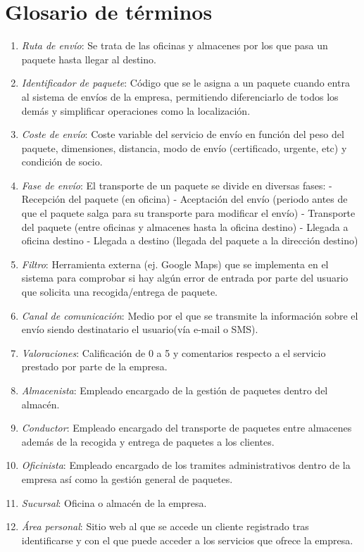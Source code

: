 \section{Glosario de términos}
	\begin{enumerate}
		\item \textit{Ruta de envío}: Se trata de las oficinas y almacenes por los que pasa un paquete hasta llegar al destino.
		\item \textit{Identificador de paquete}: Código que se le asigna a un paquete cuando entra al sistema de envíos de la empresa, permitiendo diferenciarlo de todos los demás y simplificar operaciones como la localización.
		\item \textit{Coste de envío}: Coste variable del servicio de envío en función del peso del paquete, dimensiones, distancia, modo de envío (certificado, urgente, etc) y condición de socio.
		\item \textit{Fase de envío}: El transporte de un paquete se divide en diversas fases: \newline - Recepción del paquete (en oficina)
		\newline - Aceptación del envío (periodo antes de que el paquete salga para su transporte para modificar el envío)
		\newline - Transporte del paquete (entre oficinas y almacenes hasta la oficina destino)
		\newline - Llegada a oficina destino
		\newline - Llegada a destino (llegada del paquete a la dirección destino)
		\item \textit{Filtro}: Herramienta externa (ej. Google Maps) que se implementa  en el sistema para comprobar si hay algún error de entrada por parte del usuario que solicita una recogida/entrega de paquete.
		\item \textit{Canal de comunicación}: Medio por el que se transmite la información sobre el envío siendo destinatario el usuario(vía e-mail o SMS).
		\item \textit{Valoraciones}: Calificación de 0 a 5 y comentarios respecto a el servicio prestado por parte de la empresa.
		\item \textit{Almacenista}: Empleado encargado de la gestión de paquetes dentro del almacén.
		\item \textit{Conductor}: Empleado encargado del transporte de paquetes entre almacenes además de la recogida y entrega de paquetes a los clientes.	
		\item \textit{Oficinista}: Empleado encargado de los tramites administrativos dentro de la empresa así como la gestión general de paquetes.
		\item \textit{Sucursal}: Oficina o almacén de la empresa.
		\item \textit{Área personal}: Sitio web al que se accede un cliente registrado tras identificarse y con el que puede acceder a los servicios que ofrece la empresa.
 	\end{enumerate}
\newpage


